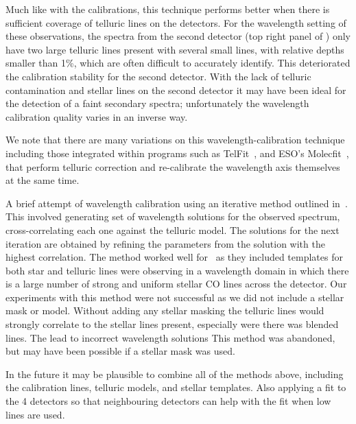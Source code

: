 Much like with the \thar{} calibrations, this technique performs better when there is sufficient coverage of telluric lines on the detectors. For the wavelength setting of these observations, the spectra from the second detector (top right panel of ) only have two large telluric lines present with several small lines, with relative depths smaller than 1\%, which are often difficult to accurately identify. This deteriorated the calibration stability for the second detector. With the lack of telluric contamination and stellar lines on the second detector it may have been ideal for the detection of a faint secondary spectra; unfortunately the wavelength calibration quality varies in an inverse way.


We note that there are many variations on this wavelength-calibration technique including those integrated within programs such as TelFit~\citet{gullikson_correcting_2014}, and ESO's Molecfit~\citet{smette_molecfit_2015}, that perform telluric correction and re-calibrate the wavelength axis themselves at the same time.


A brief attempt of wavelength calibration using an iterative method outlined in~\cite{brogi_rotation_2016}. This involved generating set of wavelength solutions for the observed spectrum, cross-correlating each one against the telluric model. The solutions for the next iteration are obtained by refining the parameters from the solution with the highest correlation.
The method worked well for~\citet{brogi_rotation_2016} as they included templates for both star and telluric lines were observing in a wavelength domain in which there is a large number of strong and uniform stellar CO lines across the detector.
Our experiments with this method were not successful as we did not include a stellar mask or model. Without adding any stellar masking the telluric lines would strongly correlate to the stellar lines present, especially were there was blended lines. The lead to incorrect wavelength solutions This method was abandoned, but may have been possible if a stellar mask was used.




In the future it may be plausible to combine all of the methods above, including the \thar{} calibration lines, telluric models, and stellar templates. Also applying a fit to the 4 detectors so that neighbouring detectors can help with the fit when low lines are used.

